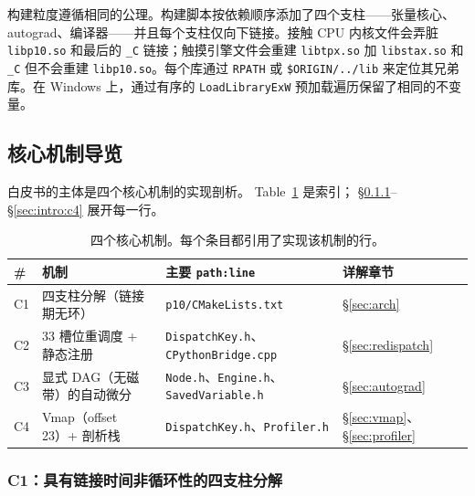 构建粒度遵循相同的公理。构建脚本按依赖顺序添加了四个支柱——张量核心、autograd、编译器——并且每个支柱仅向下链接。接触 CPU 内核文件会弄脏 \texttt{libp10.so} 和最后的 \texttt{\_C} 链接；触摸引擎文件会重建 \texttt{libtpx.so} 加 \texttt{libstax.so} 和 \texttt{\_C} 但不会重建 \texttt{libp10.so}。每个库通过 \texttt{RPATH} 或 \texttt{\$ORIGIN/../lib} 来定位其兄弟库。在 Windows 上，通过有序的 \texttt{LoadLibraryExW} 预加载遍历保留了相同的不变量。

\subsection{核心机制导览}
\label{sec:intro:contributions}

白皮书的主体是四个核心机制的实现剖析。
Table~\ref{tab:intro:contrib} 是索引； \S\ref{sec:intro:c1}--\S\ref{sec:intro:c4} 展开每一行。

\begin{table}[H]
\centering
\caption{四个核心机制。每个条目都引用了实现该机制的行。}
\label{tab:intro:contrib}
\small
\begin{tabular}{p{0.6cm}p{2.6cm}p{4.0cm}p{4.6cm}}
\toprule
\# & 机制 & 主要 \texttt{path:line} & 详解章节 \\
\midrule
C1 & 四支柱分解（链接期无环） & \texttt{p10/CMakeLists.txt} & \S\ref{sec:arch} \\
C2 & 33 槽位重调度 + 静态注册 & \texttt{DispatchKey.h}、\texttt{CPythonBridge.cpp} & \S\ref{sec:redispatch} \\
C3 & 显式 DAG（无磁带）的自动微分 & \texttt{Node.h}、\texttt{Engine.h}、\texttt{SavedVariable.h} & \S\ref{sec:autograd} \\
C4 & Vmap（offset 23）+ 剖析栈 & \texttt{DispatchKey.h}、\texttt{Profiler.h} & \S\ref{sec:vmap}、\S\ref{sec:profiler} \\
\bottomrule
\end{tabular}
\end{table}

\subsubsection{C1：具有链接时间非循环性的四支柱分解}\label{sec:intro:c1}

